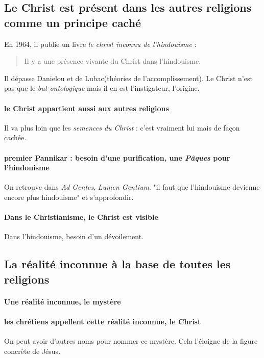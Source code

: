 \subsection{Le Christ est présent dans les autres religions comme un principe caché}

  En 1964, il publie un livre \textit{le christ inconnu de l'hindouisme} :
  \begin{quote}
      Il y a une présence vivante du Christ dans l'hindouisme.
  \end{quote}

  Il dépasse Danielou et de Lubac(théories de l'accomplissement). Le Christ n'est pas que le \textit{but ontologique} mais il en est l'instigateur, l'origine. 


  \paragraph{le Christ appartient aussi aux autres religions} Il va plus loin que les \textit{semences du Christ} : c'est vraiment lui mais de façon cachée.

\paragraph{premier Pannikar : besoin d'une purification, une \textit{Pâques} pour l'hindouisme} On retrouve dans \textit{Ad Gentes}, \textit{Lumen Gentium}. "il faut que l'hindouisme devienne encore plus hindouisme" et s'approfondir. 


\paragraph{Dans le Christianisme, le Christ est visible} Dans l'hindouisme, besoin d'un dévoilement. 


\subsection{La réalité inconnue à la base de toutes les religions} 


\paragraph{Une réalité inconnue, le mystère}

\paragraph{les chrétiens appellent cette réalité inconnue, le Christ} On peut avoir d'autres noms pour nommer ce mystère. Cela l'éloigne de la figure concrète de Jésus. 



